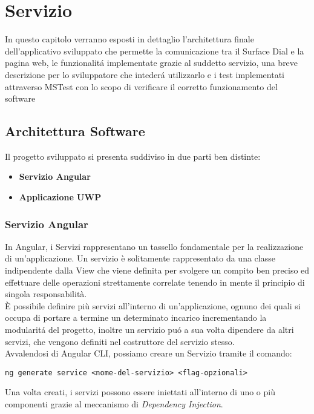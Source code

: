
\chapter{Servizio}
\label{chap:serv}
In questo capitolo verranno esposti in dettaglio l'architettura finale dell'applicativo sviluppato che permette la comunicazione tra il Surface Dial e la pagina web, le funzionalitá implementate grazie al suddetto servizio, una breve descrizione per lo sviluppatore che intederá utilizzarlo e i test implementati attraverso MSTest con lo scopo di verificare il corretto funzionamento del software
\section{Architettura Software}
Il progetto sviluppato si presenta suddiviso in due parti ben distinte:
\begin{itemize}
\item \textbf{Servizio Angular}
\item \textbf{Applicazione UWP}
\end{itemize}

\subsection{Servizio Angular}

In Angular\cite{ang}, i Servizi rappresentano un tassello fondamentale per la realizzazione di un'applicazione. Un servizio è solitamente rappresentato da una classe indipendente dalla View che viene definita per svolgere un compito ben preciso ed effettuare delle operazioni strettamente correlate tenendo in mente il principio di singola responsabilità.\\
È possibile definire più servizi all'interno di un'applicazione, ognuno dei quali si occupa di portare a termine un determinato incarico incrementando la modularitá del progetto, inoltre un servizio puó a sua volta dipendere da altri servizi, che vengono definiti nel costruttore del servizio stesso.\\

Avvalendosi di Angular CLI, possiamo creare un Servizio tramite il comando:

\vspace{1.0cm}
\begin{lstlisting}[caption={Esempio creazione servizio},style=javaScriptCode]
	ng generate service <nome-del-servizio> <flag-opzionali>
\end{lstlisting} 
\vspace{1.0cm}
Una volta creati, i servizi possono essere iniettati all'interno di uno o più componenti grazie al meccanismo di \emph{Dependency Injection}.\\


